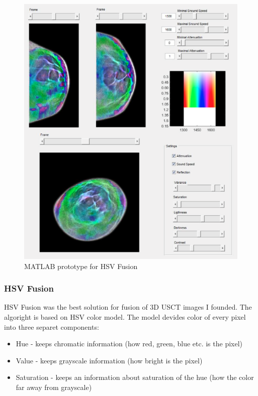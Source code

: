 \documentclass[english]{article}
\begin{document}
\begin{figure}
\centerline{\includegraphics[scale=0.4]{internship_report/pro}}
\caption{MATLAB prototype for HSV Fusion\label{fig:pro}}
\end{figure}
\subsubsection{HSV Fusion}

HSV Fusion was the best solution for fusion of 3D USCT images I founded. The algoright is based on HSV color model. The model devides color of every pixel into three separet components:

\begin{itemize}
\item Hue - keeps chromatic information (how red, green, blue etc. is the pixel)
\item Value - keeps grayscale information (how bright is the pixel)
\item Saturation - keeps an information about saturation of the hue (how the color far away from grayscale)
\end{itemize}
\end{document}
